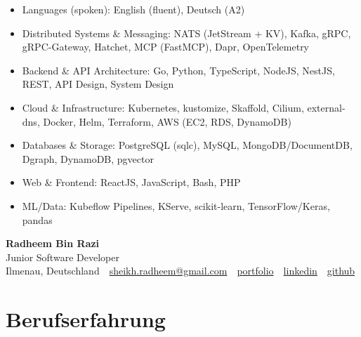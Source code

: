 \documentclass[10pt,a4paper]{resume}
\makeatletter
\newcommand{\Portfolio}{https://radheem.github.io/my-cv}
\newcommand{\PortfolioText}{portfolio}
\newcommand{\GitHub}{https://github.com/radheem}
\newcommand{\LinkedIn}{https://www.linkedin.com/in/radheem-razi}
\newcommand{\Email}{sheikh.radheem@gmail.com}
\makeatother
\begin{document}
\begin{itemize}[leftmargin=1.4em,nosep,topsep=2pt]
  \item Languages (spoken): English (fluent), Deutsch (A2)
  \item Distributed Systems \& Messaging: NATS (JetStream + KV), Kafka, gRPC, gRPC-Gateway, Hatchet, MCP (FastMCP), Dapr, OpenTelemetry
  \item Backend \& API Architecture: Go, Python, TypeScript, NodeJS, NestJS, REST, API Design, System Design
  \item Cloud \& Infrastructure: Kubernetes, kustomize, Skaffold, Cilium, external-dns, Docker, Helm, Terraform, AWS (EC2, RDS, DynamoDB)
  \item Databases \& Storage: PostgreSQL (sqlc), MySQL, MongoDB/DocumentDB, Dgraph, DynamoDB, pgvector
  \item Web \& Frontend: ReactJS, JavaScript, Bash, PHP
  \item ML/Data: Kubeflow Pipelines, KServe, scikit-learn, TensorFlow/Keras, pandas
\end{itemize}

\clearpage
{}

\begin{center}
  {\huge\bfseries Radheem Bin Razi}\\[3pt]
  {\large Junior Software Developer}\\[6pt]
  \small
  Ilmenau, Deutschland \,\textbar\,
  \href{mailto:\Email}{\Email} \,\textbar\,
  \href{\Portfolio}{\PortfolioText} \,\textbar\,
  \href{\LinkedIn}{linkedin} \,\textbar\,
  \href{\GitHub}{github}
\end{center}
\vspace{2pt}

\section{Berufserfahrung}
\end{document}
